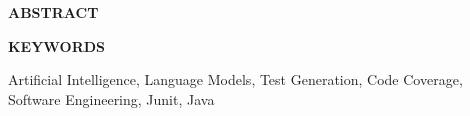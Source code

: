 \newpage
\thispagestyle{empty}
\begin{center}
    \textbf{ABSTRACT}
\end{center}

\begin{center}
    \textbf{KEYWORDS}
\end{center}
Artificial Intelligence, Language Models, Test Generation, Code Coverage, Software Engineering, Junit, Java

